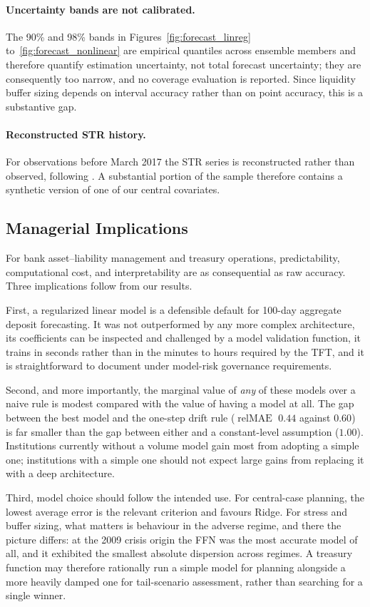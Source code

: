 \documentclass[11pt,a4paper]{article}
\newcommand{\estr}{\mbox{\texteuro STR}}
\begin{document}
\paragraph{Uncertainty bands are not calibrated.}
The 90\% and 98\% bands in Figures~\ref{fig:forecast_linreg}
to~\ref{fig:forecast_nonlinear} are empirical quantiles across ensemble
members and therefore quantify estimation uncertainty, not total forecast
uncertainty; they are consequently too narrow, and no coverage evaluation is
reported. Since liquidity buffer sizing depends on interval accuracy rather
than on point accuracy, this is a substantive gap.

\paragraph{Reconstructed \estr{} history.}
For observations before March 2017 the \estr{} series is reconstructed rather
than observed, following \citet{winkler2025}. A substantial portion of the
sample therefore contains a synthetic version of one of our central
covariates.

\subsection{Managerial Implications}
For bank asset--liability management and treasury operations, predictability,
computational cost, and interpretability are as consequential as raw accuracy.
Three implications follow from our results.

First, a regularized linear model is a defensible default for 100-day
aggregate deposit forecasting. It was not outperformed by any more complex
architecture, its coefficients can be inspected and challenged by a model
validation function, it trains in seconds rather than in the minutes to hours
required by the TFT, and it is straightforward to document under model-risk
governance requirements.

Second, and more importantly, the marginal value of \emph{any} of these models
over a naive rule is modest compared with the value of having a model at all.
The gap between the best model and the one-step drift rule
($\operatorname{relMAE}$ $0.44$ against $0.60$) is far smaller than the gap
between either and a constant-level assumption ($1.00$). Institutions
currently without a volume model gain most from adopting a simple one;
institutions with a simple one should not expect large gains from replacing it
with a deep architecture.

Third, model choice should follow the intended use. For central-case
planning, the lowest average error is the relevant criterion and favours
Ridge. For stress and buffer sizing, what matters is behaviour in the adverse
regime, and there the picture differs: at the 2009 crisis origin the FFN was
the most accurate model of all, and it exhibited the smallest absolute
dispersion across regimes. A treasury function may therefore rationally run a
simple model for planning alongside a more heavily damped one for
tail-scenario assessment, rather than searching for a single winner.
\end{document}
